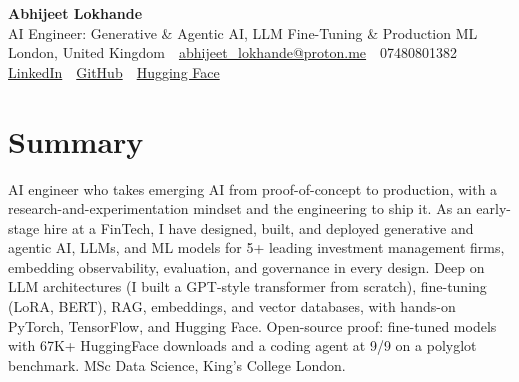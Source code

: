 \documentclass[10pt,a4paper]{article}
\newcommand{\sep}{\,\textcolor{accent!60}{\textbar}\,}
\begin{document}
\begin{center}
  {\fontsize{24}{26}\selectfont\bfseries Abhijeet Lokhande}\\[3pt]
  {\color{accent}\large AI Engineer: Generative \& Agentic AI, LLM Fine-Tuning \& Production ML}\\[5pt]
  {\small
    London, United Kingdom \sep
    \href{mailto:abhijeet_lokhande@proton.me}{abhijeet\_lokhande@proton.me} \sep
    07480801382 \\[2pt]
    \href{https://www.linkedin.com/in/ablds/}{LinkedIn} \sep
    \href{https://github.com/abhijeetscode}{GitHub} \sep
    \href{https://huggingface.co/ab-ai}{Hugging Face}
  }
\end{center}
\vspace{2pt}

\section{Summary}
AI engineer who takes emerging AI from proof-of-concept to production, with a research-and-experimentation mindset and the engineering to ship it. As an early-stage hire at a FinTech, I have designed, built, and deployed generative and agentic AI, LLMs, and ML models for 5+ leading investment management firms, embedding observability, evaluation, and governance in every design. Deep on LLM architectures (I built a GPT-style transformer from scratch), fine-tuning (LoRA, BERT), RAG, embeddings, and vector databases, with hands-on PyTorch, TensorFlow, and Hugging Face. Open-source proof: fine-tuned models with 67K+ HuggingFace downloads and a coding agent at 9/9 on a polyglot benchmark. MSc Data Science, King's College London.

\end{document}
